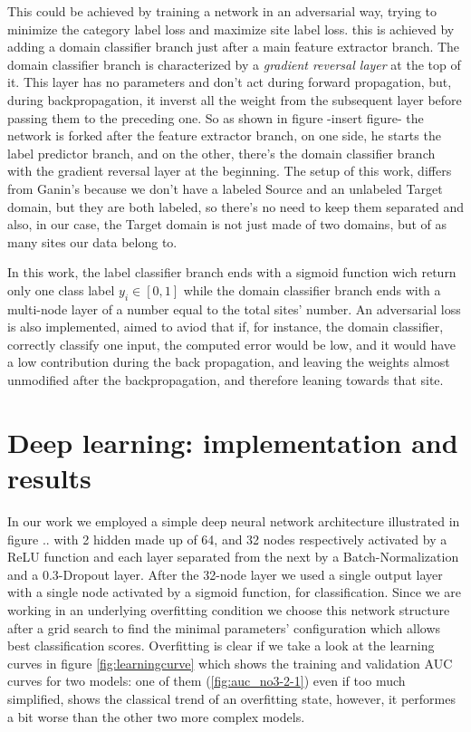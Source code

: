 \documentclass[a4paper,11pt]{article}
\begin{document}
This could be achieved by training a network in an adversarial way, trying to minimize the category label loss and maximize site label loss.
this is achieved by adding a domain classifier branch just after a main feature extractor branch.
The domain classifier branch is characterized by a \emph{gradient reversal layer} at the top of it.
This layer has no parameters and don't act during forward propagation, but, during backpropagation, it inverst all the weight from the subsequent layer before passing them to the preceding one.
So as shown in figure -insert figure- the network is forked after the feature extractor branch, on one side, he starts the label predictor branch, and on the other, there's the domain classifier branch with the gradient reversal layer at the beginning.
The setup of this work, differs from Ganin's because we don't have a labeled Source and an unlabeled Target domain, but they are both labeled, so there's no need to keep them separated and also, in our case, the Target domain is not just made of two domains, but of as many sites our data belong to.


In this work, the label classifier branch ends with a sigmoid function wich return only one class label $y_i \in [0, 1]$ while the domain classifier branch ends with a multi-node layer of a number equal to the total sites' number.
An adversarial loss is also implemented, aimed to aviod that if, for instance, the domain classifier, correctly classify one input, the computed error would be low, and it would have a low contribution during the back propagation, and leaving the weights almost unmodified after the backpropagation, and therefore leaning towards that site.

\section{Deep learning: implementation and results} \label{sec:deep_learning_results}

In our work we employed a simple deep neural network architecture illustrated in figure .. with 2 hidden made up of 64, and 32 nodes respectively activated by a ReLU function and each layer separated from the next by a Batch-Normalization and a 0.3-Dropout layer. After the 32-node layer we used a single output layer with a single node activated by a sigmoid function, for classification.
Since we are working in an underlying overfitting condition we choose this network structure after a grid search to find the minimal parameters' configuration which allows best classification scores.
Overfitting is clear if we take a look at the learning curves in figure \ref{fig:learningcurve} which shows the training and validation AUC curves for two models: one of them (\ref{fig:auc_no3-2-1}) even if too much simplified, shows the classical trend of an overfitting state, however, it performes a bit worse than the other two more complex models.
\end{document}
